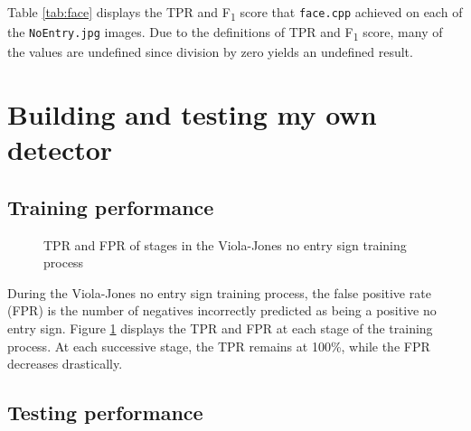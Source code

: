 \documentclass[twocolumn, 10pt, a4paper]{article}
\begin{document}
Table \ref{tab:face} displays the TPR and F\textsubscript{1} score that \texttt{face.cpp} achieved on each of the \texttt{NoEntry\textasteriskcentered.jpg} images.
Due to the definitions of TPR and F\textsubscript{1} score, many of the values are undefined since division by zero yields an undefined result.

\clearpage

\section{Building and testing my own detector}

\subsection{Training performance}

\begin{figure}[h]
  \dataset
  \caption{TPR and FPR of stages in the Viola-Jones no entry sign training process}\label{vj_training}
\end{figure}

During the Viola-Jones no entry sign training process, the false positive rate (FPR) is the number of negatives incorrectly predicted as being a positive no entry sign.
Figure \ref{vj_training} displays the TPR and FPR at each stage of the training process.
At each successive stage, the TPR remains at 100\%, while the FPR decreases drastically.
 
\subsection{Testing performance}
\end{document}
